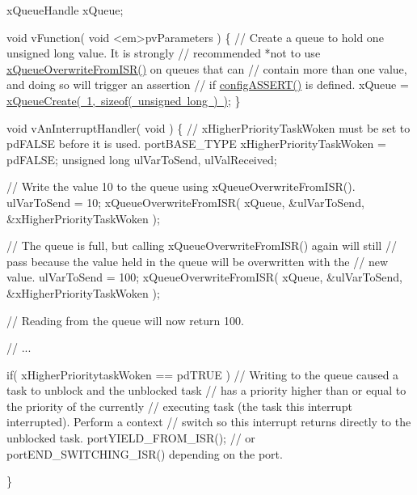 \begin{DoxyPre} xQueueHandle xQueue;\end{DoxyPre}



\begin{DoxyPre} void vFunction( void <em>pvParameters )
 \{
    // Create a queue to hold one unsigned long value.  It is strongly
    // recommended *not to use \mbox{\hyperlink{queue_8h_abdcd6a86ef82034d002193e79cfd3ce8}{xQueueOverwriteFromISR()}} on queues that can
    // contain more than one value, and doing so will trigger an assertion
    // if \mbox{\hyperlink{_free_r_t_o_s_8h_a228c70cd48927d6ab730ed1a6dfbe35f}{configASSERT()}} is defined.
    xQueue = \mbox{\hyperlink{queue_8h_aeb858b824bd74a934ea7ebb81af2a6bb}{xQueueCreate( 1, sizeof( unsigned long ) )}};
\}\end{DoxyPre}



\begin{DoxyPre}void vAnInterruptHandler( void )
\{
// xHigherPriorityTaskWoken must be set to pdFALSE before it is used.
portBASE\_TYPE xHigherPriorityTaskWoken = pdFALSE;
unsigned long ulVarToSend, ulValReceived;
\begin{DoxyVerb}// Write the value 10 to the queue using xQueueOverwriteFromISR().
ulVarToSend = 10;
xQueueOverwriteFromISR( xQueue, &ulVarToSend, &xHigherPriorityTaskWoken );

// The queue is full, but calling xQueueOverwriteFromISR() again will still
// pass because the value held in the queue will be overwritten with the
// new value.
ulVarToSend = 100;
xQueueOverwriteFromISR( xQueue, &ulVarToSend, &xHigherPriorityTaskWoken );

// Reading from the queue will now return 100.

// ...

if( xHigherPrioritytaskWoken == pdTRUE )
{
    // Writing to the queue caused a task to unblock and the unblocked task
    // has a priority higher than or equal to the priority of the currently
    // executing task (the task this interrupt interrupted).  Perform a context
    // switch so this interrupt returns directly to the unblocked task.
    portYIELD_FROM_ISR(); // or portEND_SWITCHING_ISR() depending on the port.
}
\end{DoxyVerb}

\}
 \end{DoxyPre}
 